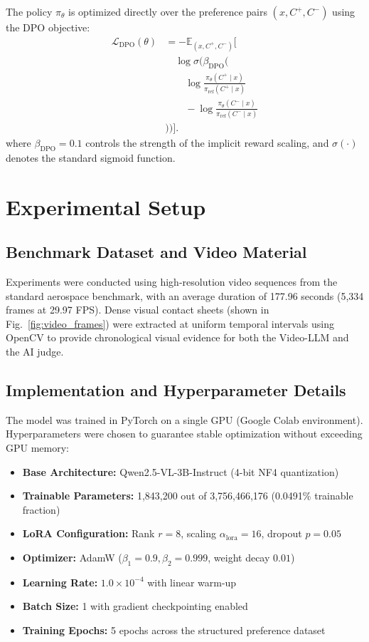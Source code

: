 \documentclass[journal]{IEEEtai}
\begin{document}
The policy $\pi_\theta$ is optimized directly over the preference pairs $(x, C^+, C^-)$ using the DPO objective:
\begin{equation}
\begin{aligned}
\mathcal{L}_{\text{DPO}}(\theta)
&= -\mathbb{E}_{(x,C^+,C^-)} \Bigg[
\\
&\quad \log \sigma \Bigg(
\beta_{\text{DPO}} \Bigg(
\\
&\qquad \log \frac{\pi_\theta(C^+ \mid x)}
{\pi_{\text{ref}}(C^+ \mid x)}
\\
&\qquad - \log \frac{\pi_\theta(C^- \mid x)}
{\pi_{\text{ref}}(C^- \mid x)}
\\
&\Bigg)\Bigg)\Bigg].
\end{aligned}
\label{eq:dpo_loss}
\end{equation}
where $\beta_{\text{DPO}}=0.1$ controls the strength of the implicit reward scaling, and $\sigma(\cdot)$ denotes the standard sigmoid function.

\section{Experimental Setup}

\subsection{Benchmark Dataset and Video Material}
Experiments were conducted using high-resolution video sequences from the standard aerospace benchmark, with an average duration of 177.96 seconds (5,334 frames at 29.97 FPS). Dense visual contact sheets (shown in Fig.~\ref{fig:video_frames}) were extracted at uniform temporal intervals using OpenCV to provide chronological visual evidence for both the Video-LLM and the AI judge.

\subsection{Implementation and Hyperparameter Details}
The model was trained in PyTorch on a single GPU (Google Colab environment). Hyperparameters were chosen to guarantee stable optimization without exceeding GPU memory:
\begin{itemize}
    \item \textbf{Base Architecture:} Qwen2.5-VL-3B-Instruct (4-bit NF4 quantization)
    \item \textbf{Trainable Parameters:} 1,843,200 out of 3,756,466,176 (0.0491\% trainable fraction)
    \item \textbf{LoRA Configuration:} Rank $r=8$, scaling $\alpha_{\text{lora}}=16$, dropout $p=0.05$
    \item \textbf{Optimizer:} AdamW ($\beta_1=0.9, \beta_2=0.999$, weight decay $0.01$)
    \item \textbf{Learning Rate:} $1.0 \times 10^{-4}$ with linear warm-up
    \item \textbf{Batch Size:} 1 with gradient checkpointing enabled
    \item \textbf{Training Epochs:} 5 epochs across the structured preference dataset
\end{itemize}
\end{document}
